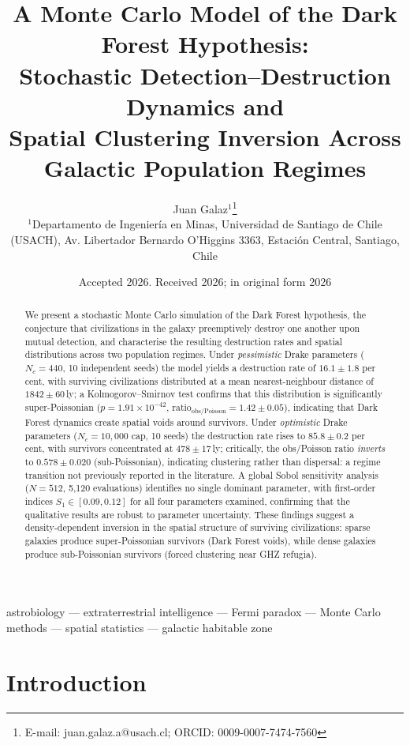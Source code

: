 \documentclass[useAMS,usenatbib]{mn2e}
\title[Dark Forest Monte Carlo]{
  A Monte Carlo Model of the Dark Forest Hypothesis:\\
  Stochastic Detection--Destruction Dynamics and\\
  Spatial Clustering Inversion Across Galactic Population Regimes
}
\author[J.~Galaz]{
  Juan Galaz$^{1}$\thanks{E-mail: juan.galaz.a@usach.cl;
  ORCID: 0009-0007-7474-7560}
  \\
  $^{1}$Departamento de Ingenier\'ia en Minas,
  Universidad de Santiago de Chile (USACH),
  Av. Libertador Bernardo O'Higgins 3363,
  Estaci\'on Central, Santiago, Chile
}
\date{Accepted 2026. Received 2026; in original form 2026}
\begin{document}
\maketitle

\begin{abstract}
We present a stochastic Monte Carlo simulation of the Dark Forest
hypothesis, the conjecture that civilizations in the galaxy preemptively
destroy one another upon mutual detection, and characterise the
resulting destruction rates and spatial distributions across two
population regimes.
Under \emph{pessimistic} Drake parameters ($N_c = 440$, 10 independent
seeds) the model yields a destruction rate of $16.1 \pm 1.8$ per cent,
with surviving civilizations distributed at a mean nearest-neighbour
distance of $1842 \pm 60$\,ly; a Kolmogorov--Smirnov test confirms
that this distribution is significantly super-Poissonian
($p = 1.91\times10^{-42}$, $\text{ratio}_\text{obs/Poisson} = 1.42 \pm 0.05$),
indicating that Dark Forest dynamics create spatial voids around survivors.
Under \emph{optimistic} Drake parameters ($N_c = 10{,}000$ cap, 10 seeds)
the destruction rate rises to $85.8 \pm 0.2$ per cent, with survivors
concentrated at $478 \pm 17$\,ly;
critically, the obs/Poisson ratio \emph{inverts} to $0.578 \pm 0.020$
(sub-Poissonian), indicating clustering rather than dispersal:
a regime transition not previously reported in the literature.
A global Sobol sensitivity analysis ($N = 512$, 5{,}120 evaluations)
identifies no single dominant parameter, with first-order indices
$S_1 \in [0.09, 0.12]$ for all four parameters examined, confirming
that the qualitative results are robust to parameter uncertainty.
These findings suggest a density-dependent inversion in the spatial
structure of surviving civilizations: sparse galaxies produce
super-Poissonian survivors (Dark Forest voids), while dense galaxies
produce sub-Poissonian survivors (forced clustering near GHZ refugia).
\end{abstract}

\begin{keywords}
astrobiology --- extraterrestrial intelligence --- Fermi paradox ---
Monte Carlo methods --- spatial statistics --- galactic habitable zone
\end{keywords}

\section{Introduction}
\label{sec:intro}
\end{document}
